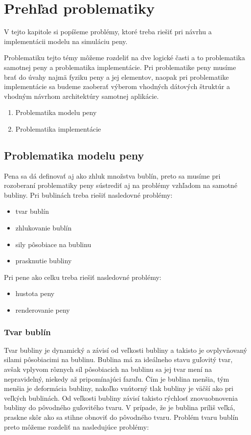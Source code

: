 \chapter{Prehľad problematiky}\label{chap:issues_overview}

V tejto kapitole si popíšeme problémy, ktoré treba riešiť pri návrhu a implementácii modelu na simuláciu peny. 

Problematiku tejto témy môžeme rozdeliť na dve logické časti a to problematika samotnej peny a problematika implementácie. Pri problematike peny musíme brať do úvahy najmä fyziku peny a jej elementov, naopak pri problematike implementácie sa budeme zaoberať výberom vhodných dátových štruktúr a vhodným návrhom architektúry samotnej aplikácie.

\begin{enumerate}
  \item Problematika modelu peny
  \item Problematika implementácie
\end{enumerate}

\section{Problematika modelu peny}
  
Pena sa dá definovať aj ako zhluk množstva bublín, preto sa musíme pri rozoberaní problematiky peny sústrediť aj na problémy vzhľadom na samotné bubliny. Pri bublinách treba riešiť nasledovné problémy:

\begin{itemize}
\item tvar bublín
\item zhlukovanie bublín
\item sily pôsobiace na bublinu
\item prasknutie bubliny
\end{itemize}

Pri pene ako celku treba riešiť nasledovné problémy:

\begin{itemize}
\item hustota peny
\item renderovanie peny
\end{itemize}  

\subsection{Tvar bublín}

Tvar bubliny je dynamický a závisí od veľkosti bubliny a takisto je ovplyvňovaný silami pôsobiacimi na bublinu. Bublina má za ideálneho stavu guľovitý tvar, avšak vplyvom rôznych síl pôsobiacich na bublinu sa jej tvar mení na nepravidelný, niekedy až pripomínajúci fazuľu. Čím je bublina menšia, tým menšia je deformácia bubliny, nakoľko vnútorný tlak bubliny je väčší ako pri veľkých bublinách. Od veľkosti bubliny závisí takisto rýchlosť znovuobnovenia bubliny do pôvodného guľovitého tvaru. V prípade, že je bublina príliš veľká, praskne skôr ako sa stihne obnoviť do pôvodného tvaru. Problém tvaru bublín preto môžeme rozdeliť na nasledujúce problémy:

